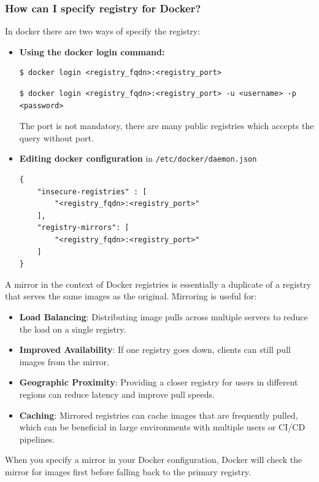 \documentclass{article}
\newenvironment{blocktemplateI}[1]{%
    \tcolorbox[beamer,%
    noparskip,breakable,
    colframe=Violet,%
    colbacklower=Black,%
    title=#1]}%
    {\endtcolorbox}
\newenvironment{blocktemplateII}[1]{%
    \tcolorbox[beamer,%
    noparskip,breakable,
    colframe=Green,%
    colbacklower=LimeGreen!75!LightGreen,%
    title=#1]}%
    {\endtcolorbox}
\newenvironment{codetemplate}[1][]{%
  \mybasecolorbox[#1]
  \itshape
}{%
  \endmybasecolorbox
}
\begin{document}
\subsubsection{How can I specify registry for Docker?}
In docker there are two ways of specify the registry:
\begin{itemize}
    \item \textbf{Using the docker login command:}
\begin{codetemplate}{}
\begin{verbatim}
$ docker login <registry_fqdn>:<registry_port>
\end{verbatim}
\end{codetemplate}
\begin{codetemplate}{}
\begin{verbatim}
$ docker login <registry_fqdn>:<registry_port> -u <username> -p <password>
\end{verbatim}
\end{codetemplate}
\begin{blocktemplateI}{NOTE}
The port is not mandatory, there are many public registries which accepts the query without port.
\end{blocktemplateI}

    \item \textbf{Editing docker configuration} in \verb|/etc/docker/daemon.json|
\begin{codetemplate}{}
\begin{verbatim}
{
    "insecure-registries" : [
        "<registry_fqdn>:<registry_port>"
    ],
    "registry-mirrors": [
        "<registry_fqdn>:<registry_port>"
    ]
}
\end{verbatim}
\end{codetemplate}
\end{itemize}

\begin{blocktemplateII}{NOTE}
A mirror in the context of Docker registries is essentially a duplicate of a registry that serves the same images as the original. Mirroring is useful for:

\begin{itemize}
    \item \textbf{Load Balancing}: Distributing image pulls across multiple servers to reduce the load on a single registry.
    \item \textbf{Improved Availability}: If one registry goes down, clients can still pull images from the mirror.
    \item \textbf{Geographic Proximity}: Providing a closer registry for users in different regions can reduce latency and improve pull speeds.
    \item \textbf{Caching}: Mirrored registries can cache images that are frequently pulled, which can be beneficial in large environments with multiple users or CI/CD pipelines.
\end{itemize}

When you specify a mirror in your Docker configuration, Docker will check the mirror for images first before falling back to the primary registry.
\end{blocktemplateII}
\end{document}
